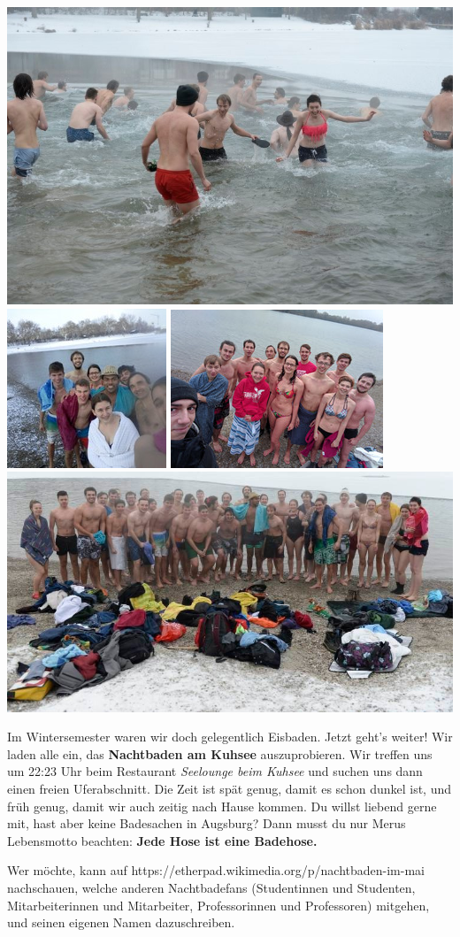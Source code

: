 \documentclass[a4paper,ngerman,landscape]{scrartcl}
\begin{document}
\begin{center}
  \includegraphics[height=0.15\textwidth]{eisbaden-5}
  \includegraphics[height=0.15\textwidth]{eisbaden-1}
  \includegraphics[height=0.15\textwidth]{eisbaden-2}
  \includegraphics[height=0.15\textwidth]{eisbaden-6}
  \medskip

  \Huge

  \Large
  \begin{minipage}{0.90\textwidth}
    \renewcommand{\baselinestretch}{1.3}

    \setlength\parskip{\medskipamount}
    \vspace{0.3em}
    Im Wintersemester waren wir doch gelegentlich Eisbaden. Jetzt geht's weiter!
    Wir laden alle ein, das \textbf{Nachtbaden am Kuhsee} auszuprobieren.
    Wir treffen uns um 22:23 Uhr beim Restaurant \emph{Seelounge beim Kuhsee}
    und suchen uns dann einen freien Uferabschnitt. Die Zeit ist spät genug,
    damit es schon dunkel ist, und früh genug, damit wir auch zeitig nach Hause
    kommen. Du willst liebend gerne mit, hast aber keine Badesachen in
    Augsburg? Dann musst du nur Merus Lebensmotto beachten:
    \textbf{Jede Hose ist eine Badehose.}

    Wer möchte, kann auf
    {https://etherpad.wikimedia.org/p/nachtbaden-im-mai} nachschauen,
    welche anderen Nacht\-bade\-fans (Studentinnen und Studenten, Mitarbeiterinnen und
    Mitarbeiter, Professorinnen und Professoren) mitgehen, und seinen eigenen
    Namen dazuschreiben.


\end{minipage}
\end{center}
\end{document}
